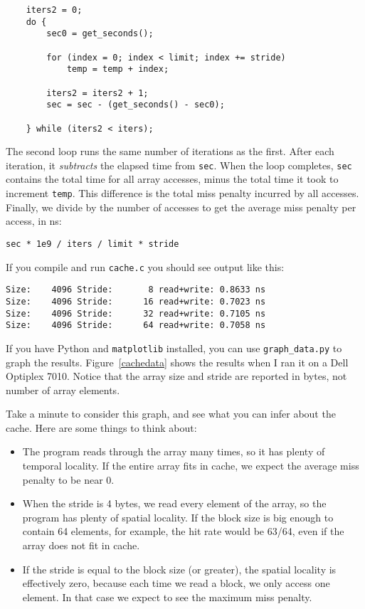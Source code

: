 \documentclass[12pt]{book}
\begin{document}
\begin{verbatim}
    iters2 = 0;
    do {
        sec0 = get_seconds();
        
        for (index = 0; index < limit; index += stride) 
            temp = temp + index;
        
        iters2 = iters2 + 1;
        sec = sec - (get_seconds() - sec0);

    } while (iters2 < iters);
\end{verbatim}

The second loop runs the same number of iterations as the first.
After each iteration, it {\em subtracts} the elapsed time from
{\tt sec}.  When the loop completes, {\tt sec} contains the total
time for all array accesses, minus the total time it took to increment
{\tt temp}.  This difference is the total miss penalty incurred by
all accesses.  Finally, we divide by the number of accesses to
get the average miss penalty per access, in ns:

\begin{verbatim}
sec * 1e9 / iters / limit * stride
\end{verbatim}

If you compile and run {\tt cache.c} you should see output like this:

\begin{verbatim}
Size:    4096 Stride:       8 read+write: 0.8633 ns
Size:    4096 Stride:      16 read+write: 0.7023 ns
Size:    4096 Stride:      32 read+write: 0.7105 ns
Size:    4096 Stride:      64 read+write: 0.7058 ns
\end{verbatim}

If you have Python and {\tt matplotlib} installed, you can use
\verb"graph_data.py" to graph the results.  Figure~\ref{cachedata}
shows the results when I ran it on a Dell Optiplex 7010.
Notice that the array size and stride are reported in
bytes, not number of array elements.

Take a minute to consider this graph, and see what you can infer
about the cache.  Here are some things to think about:

\begin{itemize}

\item The program reads through the array many times, so it has plenty
  of temporal locality.  If the entire array fits in cache, we expect
  the average miss penalty to be near 0.

\item When the stride is 4 bytes, we read every element of the array,
  so the program has plenty of spatial locality.  If the block size is
  big enough to contain 64 elements, for example, the hit rate would
  be 63/64, even if the array does not fit in cache.

\item If the stride is equal to the block size (or greater), the
  spatial locality is effectively zero, because each time we read a
  block, we only access one element.  In that case we expect to see
  the maximum miss penalty.

\end{itemize}
\end{document}
